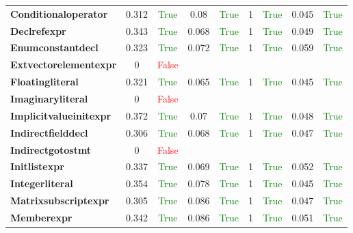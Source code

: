\documentclass{article}
\begin{document}
\begin{xltabular}{\textwidth}{lcccccccc}
\textbf{{\fontsize{10}{12}\selectfont Conditionaloperator}}& 0.312&\textcolor{green}{True}& 0.08&\textcolor{green}{True}& 1&\textcolor{green}{True}& 0.045&\textcolor{green}{True} \\[0.5ex]
\textbf{{\fontsize{10}{12}\selectfont Declrefexpr}}& 0.343&\textcolor{green}{True}& 0.068&\textcolor{green}{True}& 1&\textcolor{green}{True}& 0.049&\textcolor{green}{True} \\[0.5ex]
\textbf{{\fontsize{10}{12}\selectfont Enumconstantdecl}}& 0.323&\textcolor{green}{True}& 0.072&\textcolor{green}{True}& 1&\textcolor{green}{True}& 0.059&\textcolor{green}{True} \\[0.5ex]
\textbf{{\fontsize{10}{12}\selectfont Extvectorelementexpr}}& 0&\textcolor{red}{False} \\[0.5ex]
\textbf{{\fontsize{10}{12}\selectfont Floatingliteral}}& 0.321&\textcolor{green}{True}& 0.065&\textcolor{green}{True}& 1&\textcolor{green}{True}& 0.045&\textcolor{green}{True} \\[0.5ex]
\textbf{{\fontsize{10}{12}\selectfont Imaginaryliteral}}& 0&\textcolor{red}{False} \\[0.5ex]
\textbf{{\fontsize{10}{12}\selectfont Implicitvalueinitexpr}}& 0.372&\textcolor{green}{True}& 0.07&\textcolor{green}{True}& 1&\textcolor{green}{True}& 0.048&\textcolor{green}{True} \\[0.5ex]
\textbf{{\fontsize{10}{12}\selectfont Indirectfielddecl}}& 0.306&\textcolor{green}{True}& 0.068&\textcolor{green}{True}& 1&\textcolor{green}{True}& 0.047&\textcolor{green}{True} \\[0.5ex]
\textbf{{\fontsize{10}{12}\selectfont Indirectgotostmt}}& 0&\textcolor{red}{False} \\[0.5ex]
\textbf{{\fontsize{10}{12}\selectfont Initlistexpr}}& 0.337&\textcolor{green}{True}& 0.069&\textcolor{green}{True}& 1&\textcolor{green}{True}& 0.052&\textcolor{green}{True} \\[0.5ex]
\textbf{{\fontsize{10}{12}\selectfont Integerliteral}}& 0.354&\textcolor{green}{True}& 0.078&\textcolor{green}{True}& 1&\textcolor{green}{True}& 0.045&\textcolor{green}{True} \\[0.5ex]
\textbf{{\fontsize{10}{12}\selectfont Matrixsubscriptexpr}}& 0.305&\textcolor{green}{True}& 0.086&\textcolor{green}{True}& 1&\textcolor{green}{True}& 0.047&\textcolor{green}{True} \\[0.5ex]
\textbf{{\fontsize{10}{12}\selectfont Memberexpr}}& 0.342&\textcolor{green}{True}& 0.086&\textcolor{green}{True}& 1&\textcolor{green}{True}& 0.051&\textcolor{green}{True} \\[0.5ex]

\end{xltabular}
\end{document}

